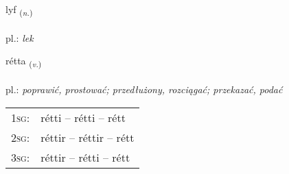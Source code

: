 \documentclass[frontgrid, backgrid]{flacards}\usepackage[]{graphicx}\usepackage[]{xcolor}
\begin{document}
\renewcommand{\flhead}{\vskip5pt \fboxsep=0pt {\small\bfseries\footnotesize Nafnorð | Noun}}
\renewcommand{\fcfoot}{\vskip5pt \fboxsep=0pt \hspace{2pt}{\small\bfseries\footnotesize 2K}}

\renewcommand{\blhead}{\vskip5pt {\small\bfseries\footnotesize Nafnorð | Noun }}
\renewcommand{\bcfoot}{\vskip5pt \hspace{2pt}{\small\bfseries\footnotesize 2K}}


{lyf \small{\textsubscript{(\textit{n.})}} \\[1ex] %
\textphonetic{[lɪːv]} \\
pl.: \emph{lek} \\  [2ex]
\renewcommand*{\arraystretch}{0.8}
}

\renewcommand{\flhead}{\vskip5pt \fboxsep=0pt {\small\bfseries\footnotesize Sagnorð | Verb}}
\renewcommand{\fcfoot}{\vskip5pt \fboxsep=0pt \hspace{2pt}{\small\bfseries\footnotesize 2K}}

\renewcommand{\blhead}{\vskip5pt {\small\bfseries\footnotesize Sagnorð | Verb }}
\renewcommand{\bcfoot}{\vskip5pt \hspace{2pt}{\small\bfseries\footnotesize 2K}}


{rétta \small{\textsubscript{(\textit{v.})}} \\[1ex] %
\textphonetic{[rjɛhta]} \\
pl.: \emph{poprawić, prostować; przedłużony, rozciągać; przekazać, podać} \\  [2ex]
\renewcommand*{\arraystretch}{0.8}
\begin{tabular}{p{1cm}l}
\textsc{1sg}: & rétti -- rétti -- rétt \\ 
\textsc{2sg}: & réttir -- réttir -- rétt \\ 
\textsc{3sg}: & réttir -- rétti -- rétt \\ 
\end{tabular}
}
\end{document}
